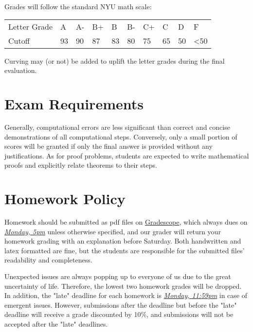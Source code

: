 \documentclass[letterpaper]{inzane_syllabus} %
\begin{document}
Grades will follow the standard NYU math scale: 
\begin{center}
\begin{tabular}{ p{2.5cm} p{0.7cm} p{0.7cm} p{0.7cm} p{0.7cm} p{0.7cm} p{0.7cm} p{0.7cm} p{0.7cm} p{0.7cm}}
\hline
 Letter Grade        & A & A- & B+ & B & B- & C+ & C & D &F \\ 
 Cutoff              & 93 & 90 & 87 & 83 & 80 & 75 & 65 & 50 & <50  \\
 \hline 
\end{tabular}
\end{center}
Curving may (or not) be added to uplift the letter grades during the final evaluation. 

\vspace{0.5cm}
\section{Exam Requirements}
Generally, computational errors are less significant than correct and concise demonstrations of all computational steps. Conversely, only a small portion of scores will be granted if only the final answer is provided without any justifications. As for proof problems, students are expected to write mathematical proofs and explicitly relate theorems to their steps.  

\newpage %

\makeSide %

\vspace{0.5cm}
\section{Homework Policy}
Homework should be submitted as pdf files on \href{https://www.gradescope.com/courses/360869}{Gradescope}, which always dues on \textit{\underline{Monday, 5pm}} unless otherwise specified, and our grader will return your homework grading with an explanation before Saturday. Both handwritten and latex formatted are fine, but the students are responsible for the submitted files' readability and completeness. 

Unexpected issues are always popping up to everyone of us due to the great uncertainty of life. Therefore, the lowest two homework grades will be dropped. In addition, the "late" deadline for each homework is \textit{\underline{Monday, 11:59pm}} in case of emergent issues. However, submissions after the deadline but before the "late" deadline will receive a grade discounted by 10\%, and submissions will not be accepted after the "late" deadlines.  
\end{document}
